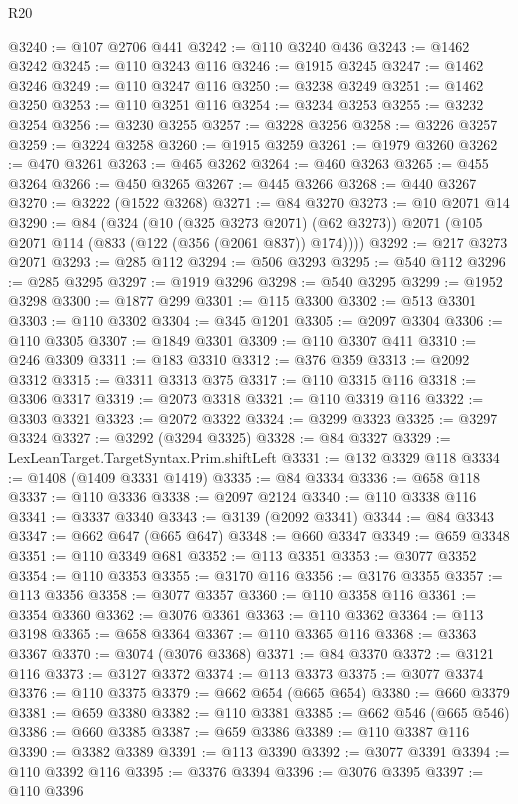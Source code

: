 \begin{lexlean}{R20}
\begin{coremodule}
@3240 := @107 @2706 @441
@3242 := @110 @3240 @436
@3243 := @1462 @3242
@3245 := @110 @3243 @116
@3246 := @1915 @3245
@3247 := @1462 @3246
@3249 := @110 @3247 @116
@3250 := @3238 @3249
@3251 := @1462 @3250
@3253 := @110 @3251 @116
@3254 := @3234 @3253
@3255 := @3232 @3254
@3256 := @3230 @3255
@3257 := @3228 @3256
@3258 := @3226 @3257
@3259 := @3224 @3258
@3260 := @1915 @3259
@3261 := @1979 @3260
@3262 := @470 @3261
@3263 := @465 @3262
@3264 := @460 @3263
@3265 := @455 @3264
@3266 := @450 @3265
@3267 := @445 @3266
@3268 := @440 @3267
@3270 := @3222 (@1522 @3268)
@3271 := @84 @3270
@3273 := @10 @2071 @14
@3290 := @84
    (@324
      (@10 (@325 @3273 @2071) (@62 @3273))
      @2071
      (@105 @2071 @114 (@833 (@122 (@356 (@2061 @837)) @174))))
@3292 := @217 @3273 @2071
@3293 := @285 @112
@3294 := @506 @3293
@3295 := @540 @112
@3296 := @285 @3295
@3297 := @1919 @3296
@3298 := @540 @3295
@3299 := @1952 @3298
@3300 := @1877 @299
@3301 := @115 @3300
@3302 := @513 @3301
@3303 := @110 @3302
@3304 := @345 @1201
@3305 := @2097 @3304
@3306 := @110 @3305
@3307 := @1849 @3301
@3309 := @110 @3307 @411
@3310 := @246 @3309
@3311 := @183 @3310
@3312 := @376 @359
@3313 := @2092 @3312
@3315 := @3311 @3313 @375
@3317 := @110 @3315 @116
@3318 := @3306 @3317
@3319 := @2073 @3318
@3321 := @110 @3319 @116
@3322 := @3303 @3321
@3323 := @2072 @3322
@3324 := @3299 @3323
@3325 := @3297 @3324
@3327 := @3292 (@3294 @3325)
@3328 := @84 @3327
@3329 := LexLeanTarget.TargetSyntax.Prim.shiftLeft
@3331 := @132 @3329 @118
@3334 := @1408 (@1409 @3331 @1419)
@3335 := @84 @3334
@3336 := @658 @118
@3337 := @110 @3336
@3338 := @2097 @2124
@3340 := @110 @3338 @116
@3341 := @3337 @3340
@3343 := @3139 (@2092 @3341)
@3344 := @84 @3343
@3347 := @662 @647 (@665 @647)
@3348 := @660 @3347
@3349 := @659 @3348
@3351 := @110 @3349 @681
@3352 := @113 @3351
@3353 := @3077 @3352
@3354 := @110 @3353
@3355 := @3170 @116
@3356 := @3176 @3355
@3357 := @113 @3356
@3358 := @3077 @3357
@3360 := @110 @3358 @116
@3361 := @3354 @3360
@3362 := @3076 @3361
@3363 := @110 @3362
@3364 := @113 @3198
@3365 := @658 @3364
@3367 := @110 @3365 @116
@3368 := @3363 @3367
@3370 := @3074 (@3076 @3368)
@3371 := @84 @3370
@3372 := @3121 @116
@3373 := @3127 @3372
@3374 := @113 @3373
@3375 := @3077 @3374
@3376 := @110 @3375
@3379 := @662 @654 (@665 @654)
@3380 := @660 @3379
@3381 := @659 @3380
@3382 := @110 @3381
@3385 := @662 @546 (@665 @546)
@3386 := @660 @3385
@3387 := @659 @3386
@3389 := @110 @3387 @116
@3390 := @3382 @3389
@3391 := @113 @3390
@3392 := @3077 @3391
@3394 := @110 @3392 @116
@3395 := @3376 @3394
@3396 := @3076 @3395
@3397 := @110 @3396

\end{coremodule}
\end{lexlean}
